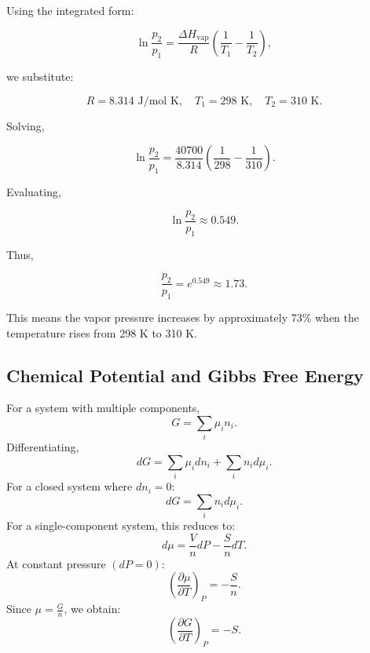 \documentclass{article}
\theoremstyle{definition}
\begin{document}
Using the integrated form:

\begin{equation}
\ln \frac{p_2}{p_1} = \frac{\Delta H_{\text{vap}}}{R} \left( \frac{1}{T_1} - \frac{1}{T_2} \right),
\end{equation}

we substitute:

\begin{equation}
R = 8.314 \text{ J/mol K}, \quad T_1 = 298 \text{ K}, \quad T_2 = 310 \text{ K}.
\end{equation}

Solving,

\begin{equation}
\ln \frac{p_2}{p_1} = \frac{40700}{8.314} \left( \frac{1}{298} - \frac{1}{310} \right).
\end{equation}

Evaluating,

\begin{equation}
\ln \frac{p_2}{p_1} \approx 0.549.
\end{equation}

Thus,

\begin{equation}
\frac{p_2}{p_1} = e^{0.549} \approx 1.73.
\end{equation}

This means the vapor pressure increases by approximately 73\% when the temperature rises from 298 K to 310 K.


\subsection{Chemical Potential and Gibbs Free Energy}
For a system with multiple components,
\begin{equation}
    G = \sum_i \mu_i n_i.
\end{equation}
Differentiating,
\begin{equation}
    dG = \sum_i \mu_i dn_i + \sum_i n_i d\mu_i.
\end{equation}
For a closed system where \( dn_i = 0 \):
\begin{equation}
    dG = \sum_i n_i d\mu_i.
\end{equation}
For a single-component system, this reduces to:
\begin{equation}
    d\mu = \frac{V}{n} dP - \frac{S}{n} dT.
\end{equation}
At constant pressure \( (dP = 0) \):
\begin{equation}
    \left(\frac{\partial \mu}{\partial T} \right)_P = -\frac{S}{n}.
\end{equation}
Since \( \mu = \frac{G}{n} \), we obtain:
\begin{equation}
    \left(\frac{\partial G}{\partial T} \right)_P = -S.
\end{equation}
\end{document}
